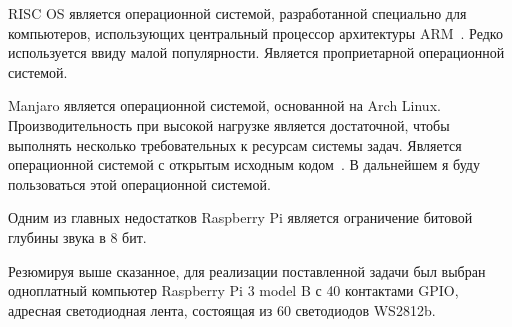 RISC OS является операционной системой, разработанной специально для компьютеров, использующих центральный процессор архитектуры ARM~\cite{risc-os}. Редко используется ввиду малой популярности. Является проприетарной операционной системой.

Manjaro является операционной системой, основанной на Arch Linux. Производительность при высокой нагрузке является достаточной, чтобы выполнять несколько требовательных к ресурсам системы задач. Является операционной системой с открытым исходным кодом~\cite{manjaro}. В дальнейшем я буду пользоваться этой операционной системой.

Одним из главных недостатков Raspberry Pi является ограничение битовой глубины звука в 8 бит.

Резюмируя выше сказанное, для реализации поставленной задачи был выбран одноплатный компьютер Raspberry Pi 3 model B с 40 контактами GPIO, адресная светодиодная лента, состоящая из 60 светодиодов WS2812b.